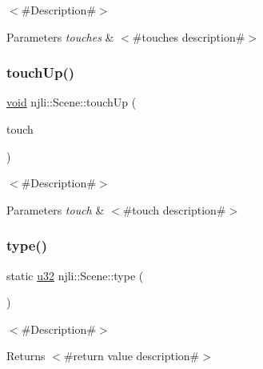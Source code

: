 $<$\#\+Description\#$>$


\begin{DoxyParams}{Parameters}
{\em touches} & $<$\#touches description\#$>$ \\
\hline
\end{DoxyParams}
\mbox{\label{classnjli_1_1_scene_adbe3003a2a52c0fff0b00deb461692cd}} 
\subsubsection{\texorpdfstring{touch\+Up()}{touchUp()}\hspace{0.1cm}{\footnotesize\ttfamily [2/2]}}
{\footnotesize\ttfamily \mbox{\hyperlink{_thread_8h_af1e856da2e658414cb2456cb6f7ebc66}{void}} njli\+::\+Scene\+::touch\+Up (\begin{DoxyParamCaption}\item[{const \mbox{\hyperlink{classnjli_1_1_device_touch}{Device\+Touch}} \&}]{touch }\end{DoxyParamCaption})}

$<$\#\+Description\#$>$


\begin{DoxyParams}{Parameters}
{\em touch} & $<$\#touch description\#$>$ \\
\hline
\end{DoxyParams}
\mbox{\label{classnjli_1_1_scene_aa760cdf1cda1dd3a460f11e257fd46b1}} 
\subsubsection{\texorpdfstring{type()}{type()}}
{\footnotesize\ttfamily static \mbox{\hyperlink{_util_8h_a10e94b422ef0c20dcdec20d31a1f5049}{u32}} njli\+::\+Scene\+::type (\begin{DoxyParamCaption}{ }\end{DoxyParamCaption})\hspace{0.3cm}{\ttfamily [static]}}

$<$\#\+Description\#$>$

\begin{DoxyReturn}{Returns}
$<$\#return value description\#$>$ 
\end{DoxyReturn}
\mbox{\label{classnjli_1_1_scene_adbc56ddd00f3388e58112a75725f341b}} 
